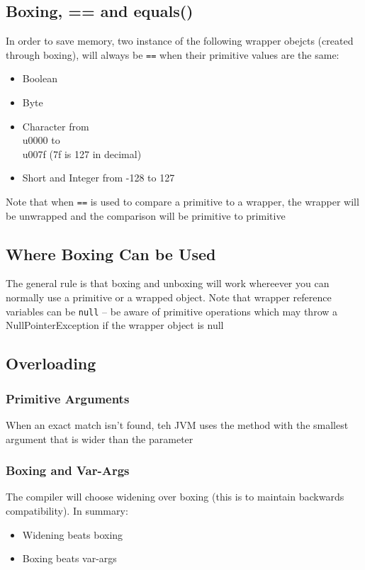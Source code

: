 \subsection{Boxing, == and equals()}
In order to save memory, two instance of the following wrapper obejcts (created 
through boxing), will always be \verb#==# when their primitive values are the 
same:
\begin{itemize}
    \item Boolean
    \item Byte
    \item Character from \\u0000 to \\u007f (7f is 127 in decimal)
    \item Short and Integer from -128 to 127
\end{itemize}
Note that when \verb#==# is used to compare a primitive to a wrapper, the 
wrapper will be unwrapped and the comparison will be primitive to primitive

\subsection{Where Boxing Can be Used}
The general rule is that boxing and unboxing will work whereever you can 
normally use a primitive or a wrapped object. Note that wrapper reference 
variables can be \verb#null# -- be aware of primitive operations which may 
throw a NullPointerException if the wrapper object is null

\subsection{Overloading}
\subsubsection{Primitive Arguments}
When an exact match isn't found, teh JVM uses the method with the smallest 
argument that is wider than the parameter

\subsubsection{Boxing and Var-Args}
The compiler will choose widening over boxing (this is to maintain backwards 
compatibility). In summary:
\begin{itemize}
    \item Widening beats boxing
    \item Boxing beats var-args
\end{itemize}

